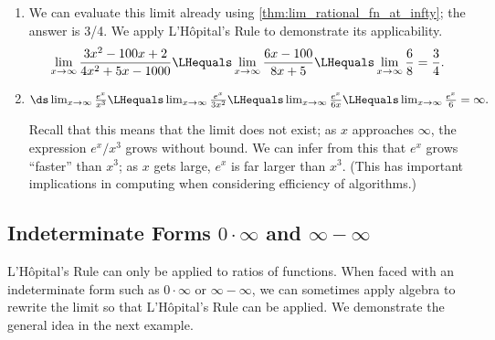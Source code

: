 \begin{example}
\begin{enumerate}
	\item	We can evaluate this limit already using \autoref{thm:lim_rational_fn_at_infty}; the answer is 3/4. We apply L'H\^opital's Rule to demonstrate its applicability.
\[
 \lim_{x\to\infty} \frac{3x^2-100x+2}{4x^2+5x-1000}
 \LHequals \lim_{x\to\infty} \frac{6x-100}{8x+5}
 \LHequals \lim_{x\to\infty} \frac68 = \frac34.
\]

	\item	$\ds\lim_{x\to \infty}\frac{e^x}{x^3} \LHequals \lim_{x\to\infty} \frac{e^x}{3x^2} \LHequals \lim_{x\to\infty} \frac{e^x}{6x} \LHequals \lim_{x\to\infty} \frac{e^x}{6} = \infty.$

Recall that this means that the limit does not exist; as $x$ approaches $\infty$, the expression $e^x/x^3$ grows without bound. We can infer from this that $e^x$ grows ``faster'' than $x^3$; as $x$ gets large, $e^x$ is far larger than $x^3$. (This has important implications in computing when considering efficiency of algorithms.)
\end{enumerate}
\end{example}

\subsection{Indeterminate Forms \texorpdfstring{$0\cdot\infty$ and $\infty-\infty$}{0·∞ and ∞-∞}}

L'H\^opital's Rule can only be applied to ratios of functions. When faced with an indeterminate form such as $0\cdot\infty$ or $\infty-\infty$, we can sometimes apply algebra to rewrite the limit so that L'H\^opital's Rule can be applied. We demonstrate the general idea in the next example.



